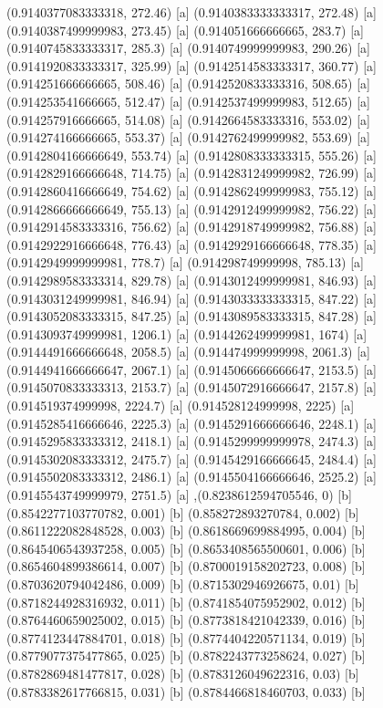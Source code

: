 {{{(0.9140377083333318, 272.46) [a] 
(0.9140383333333317, 272.48) [a] 
(0.9140387499999983, 273.45) [a] 
(0.914051666666665, 283.7) [a] 
(0.9140745833333317, 285.3) [a] 
(0.9140749999999983, 290.26) [a] 
(0.9141920833333317, 325.99) [a] 
(0.9142514583333317, 360.77) [a] 
(0.914251666666665, 508.46) [a] 
(0.9142520833333316, 508.65) [a] 
(0.914253541666665, 512.47) [a] 
(0.9142537499999983, 512.65) [a] 
(0.914257916666665, 514.08) [a] 
(0.9142664583333316, 553.02) [a] 
(0.914274166666665, 553.37) [a] 
(0.9142762499999982, 553.69) [a] 
(0.9142804166666649, 553.74) [a] 
(0.9142808333333315, 555.26) [a] 
(0.9142829166666648, 714.75) [a] 
(0.9142831249999982, 726.99) [a] 
(0.9142860416666649, 754.62) [a] 
(0.9142862499999983, 755.12) [a] 
(0.9142866666666649, 755.13) [a] 
(0.9142912499999982, 756.22) [a] 
(0.9142914583333316, 756.62) [a] 
(0.9142918749999982, 756.88) [a] 
(0.9142922916666648, 776.43) [a] 
(0.9142929166666648, 778.35) [a] 
(0.9142949999999981, 778.7) [a] 
(0.914298749999998, 785.13) [a] 
(0.9142989583333314, 829.78) [a] 
(0.9143012499999981, 846.93) [a] 
(0.9143031249999981, 846.94) [a] 
(0.9143033333333315, 847.22) [a] 
(0.9143052083333315, 847.25) [a] 
(0.9143089583333315, 847.28) [a] 
(0.9143093749999981, 1206.1) [a] 
(0.9144262499999981, 1674) [a] 
(0.9144491666666648, 2058.5) [a] 
(0.914474999999998, 2061.3) [a] 
(0.9144941666666647, 2067.1) [a] 
(0.9145066666666647, 2153.5) [a] 
(0.9145070833333313, 2153.7) [a] 
(0.9145072916666647, 2157.8) [a] 
(0.914519374999998, 2224.7) [a] 
(0.914528124999998, 2225) [a] 
(0.9145285416666646, 2225.3) [a] 
(0.9145291666666646, 2248.1) [a] 
(0.9145295833333312, 2418.1) [a] 
(0.9145299999999978, 2474.3) [a] 
(0.9145302083333312, 2475.7) [a] 
(0.9145429166666645, 2484.4) [a] 
(0.9145502083333312, 2486.1) [a] 
(0.9145504166666646, 2525.2) [a] 
(0.9145543749999979, 2751.5) [a] 
},{(0.8238612594705546, 0) [b] 
(0.8542277103770782, 0.001) [b] 
(0.858272893270784, 0.002) [b] 
(0.8611222082848528, 0.003) [b] 
(0.8618669699884995, 0.004) [b] 
(0.8645406543937258, 0.005) [b] 
(0.8653408565500601, 0.006) [b] 
(0.8654604899386614, 0.007) [b] 
(0.8700019158202723, 0.008) [b] 
(0.8703620794042486, 0.009) [b] 
(0.8715302946926675, 0.01) [b] 
(0.8718244928316932, 0.011) [b] 
(0.8741854075952902, 0.012) [b] 
(0.8764460659025002, 0.015) [b] 
(0.8773818421042339, 0.016) [b] 
(0.8774123447884701, 0.018) [b] 
(0.8774404220571134, 0.019) [b] 
(0.8779077375477865, 0.025) [b] 
(0.8782243773258624, 0.027) [b] 
(0.8782869481477817, 0.028) [b] 
(0.8783126049622316, 0.03) [b] 
(0.8783382617766815, 0.031) [b] 
(0.8784466818460703, 0.033) [b] 
}}}
